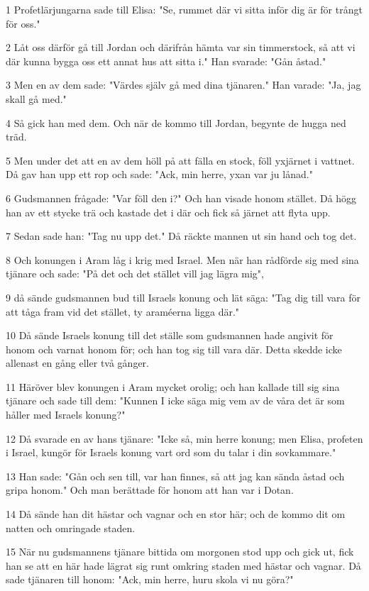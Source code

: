 \par 1 Profetlärjungarna sade till Elisa: "Se, rummet där vi sitta inför dig är för trångt för oss."
\par 2 Låt oss därför gå till Jordan och därifrån hämta var sin timmerstock, så att vi där kunna bygga oss ett annat hus att sitta i." Han svarade: "Gån åstad."
\par 3 Men en av dem sade: "Värdes själv gå med dina tjänaren." Han varade: "Ja, jag skall gå med."
\par 4 Så gick han med dem. Och när de kommo till Jordan, begynte de hugga ned träd.
\par 5 Men under det att en av dem höll på att fälla en stock, föll yxjärnet i vattnet. Då gav han upp ett rop och sade: "Ack, min herre, yxan var ju lånad."
\par 6 Gudsmannen frågade: "Var föll den i?" Och han visade honom stället. Då högg han av ett stycke trä och kastade det i där och fick så järnet att flyta upp.
\par 7 Sedan sade han: "Tag nu upp det." Då räckte mannen ut sin hand och tog det.
\par 8 Och konungen i Aram låg i krig med Israel. Men när han rådförde sig med sina tjänare och sade: "På det och det stället vill jag lägra mig",
\par 9 då sände gudsmannen bud till Israels konung och lät säga: "Tag dig till vara för att tåga fram vid det stället, ty araméerna ligga där."
\par 10 Då sände Israels konung till det ställe som gudsmannen hade angivit för honom och varnat honom för; och han tog sig till vara där. Detta skedde icke allenast en gång eller två gånger.
\par 11 Häröver blev konungen i Aram mycket orolig; och han kallade till sig sina tjänare och sade till dem: "Kunnen I icke säga mig vem av de våra det är som håller med Israels konung?"
\par 12 Då svarade en av hans tjänare: "Icke så, min herre konung; men Elisa, profeten i Israel, kungör för Israels konung vart ord som du talar i din sovkammare."
\par 13 Han sade: "Gån och sen till, var han finnes, så att jag kan sända åstad och gripa honom." Och man berättade för honom att han var i Dotan.
\par 14 Då sände han dit hästar och vagnar och en stor här; och de kommo dit om natten och omringade staden.
\par 15 När nu gudsmannens tjänare bittida om morgonen stod upp och gick ut, fick han se att en här hade lägrat sig runt omkring staden med hästar och vagnar. Då sade tjänaren till honom: "Ack, min herre, huru skola vi nu göra?"
